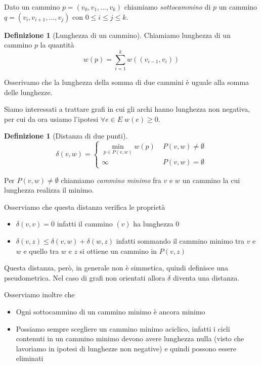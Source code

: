 \documentclass[a4paper,10pt]{amsbook}
\newcounter{counter1}
\theoremstyle{plain}
\theoremstyle{definition}
\newtheorem{mydef}[counter1]{Definizione}
\theoremstyle{remark}
\newcommand{\pa}[1]{\left(#1\right)}
\begin{document}
Dato un cammino $p = ( v_0, v_1, ..., v_k)$ chiamiamo
\textit{sottocammino} di $p$ un cammino $q = ( v_i , v_{i+1}, ... ,
v_j )$ con $0 \le i \le j \le k$.

\begin{mydef}[Lunghezza di un cammino]
  Chiamiamo lunghezza di un cammino $p$ la quantità
  \[ w(p) = \sum _{i=1} ^k w \pa{ (v_{i-1}, v_i) } \]
\end{mydef}

Osserivamo che la lunghezza della somma di due cammini è uguale alla
somma delle lunghezze.

Siamo interessati a trattare grafi in cui gli archi hanno lunghezza
non negativa, per cui da ora usiamo l'ipotesi $\forall e \in E \; w(e)
\ge 0$.

\begin{mydef}[Distanza di due punti]
  \[ \delta(v,w) = \left\{
    \begin{matrix}
      \min \limits_{p \in P(v,w)} { w(p) } & \; P(v,w) \neq \emptyset \\
      \infty & \; P(v,w) = \emptyset
    \end{matrix}
    \right.
    \]
\end{mydef}

Per $P(v,w) \neq \emptyset$ chiamiamo \textit{cammino minimo} fra $v$
e $w$ un cammino la cui lunghezza realizza il minimo.

Osserviamo che questa distanza verifica le proprietà
\begin{itemize}
\item $\delta(v,v) = 0$ infatti il cammino $(v)$ ha lunghezza $0$
\item $\delta(v,z) \le \delta(v,w) + \delta(w,z)$ infatti sommando il
  cammino minimo tra $v$ e $w$ e quello tra $w$ e $z$ si ottiene un
  cammino in $P(v,z)$
\end{itemize}
Questa distanza, però, in generale non è simmetica, quindi definisce
una pseudometrica. Nel caso di grafi non orientati allora $\delta$
diventa una distanza.

Osserviamo inoltre che
\begin{itemize}
\item Ogni sottocammino di un cammino minimo è ancora minimo
\item Possiamo sempre scegliere un cammino minimo aciclico, infatti i
  cicli contenuti in un cammino minimo devono avere lunghezza nulla
  (visto che lavoriamo in ipotesi di lunghezze non negative) e quindi
  possono essere eliminati
\end{itemize}
\end{document}
